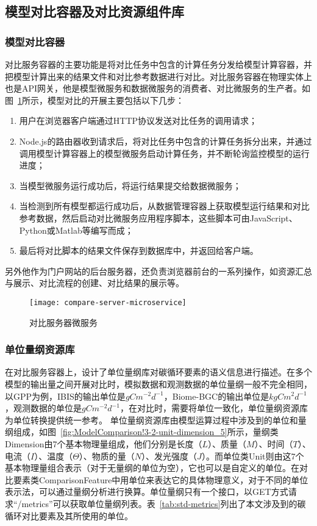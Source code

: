 \subsection{模型对比容器及对比资源组件库}
\subsubsection{模型对比容器}
对比服务容器的主要功能是将对比任务中包含的计算任务分发给模型计算容器，并把模型计算出来的结果文件和对比参考数据进行对比。对比服务容器在物理实体上也是API网关，他是模型微服务和数据微服务的消费者、对比微服务的生产者。如图~\ref{fig:compare-server-microservice}所示，模型对比的开展主要包括以下几步：

\begin{enumerate}[(1)]
\item 用户在浏览器客户端通过HTTP协议发送对比任务的调用请求；
\item Node.js的路由器收到请求后，将对比任务中包含的计算任务拆分出来，并通过调用模型计算容器上的模型微服务启动计算任务，并不断轮询监控模型的运行进度；
\item 当模型微服务运行成功后，将运行结果提交给数据微服务；
\item 当检测到所有模型都运行成功后，从数据管理容器上获取模型运行结果和对比参考数据，然后启动对比微服务应用程序脚本，这些脚本可由JavaScript、Python或Matlab等编写而成；
\item 最后将对比脚本的结果文件保存到数据库中，并返回给客户端。
\end{enumerate}

另外他作为门户网站的后台服务器，还负责浏览器前台的一系列操作，如资源汇总与展示、对比流程的创建、对比结果的展示等。

\begin{figure}[!htbp]
    \centering
    \texttt{[image: compare-server-microservice]}
    \caption{对比服务器微服务}
    \label{fig:compare-server-microservice}
\end{figure}

\subsubsection{单位量纲资源库}
在对比服务容器上，设计了单位量纲库对碳循环要素的语义信息进行描述。在多个模型的输出量之间开展对比时，模拟数据和观测数据的单位量纲一般不完全相同，以GPP为例，IBIS的输出单位是$gC m^{-2} d^{-1}$，Biome-BGC的输出单位是$kgC m^2 d^{-1}$，观测数据的单位是$gC m^{-2} d^{-1}$，在对比时，需要将单位一致化，单位量纲资源库为单位转换提供统一参考。
单位量纲资源库由模型运算过程中涉及到的单位和量纲组成，如图~\ref{fig:ModelComparison!3-2-unit-dimension_5}所示，量纲类Dimension由7个基本物理量组成，他们分别是长度（$L$）、质量（$M$）、时间（$T$）、电流（$I$）、温度（$\Theta$）、物质的量（$N$）、发光强度（$J$）。而单位类Unit则由这7个基本物理量组合表示（对于无量纲的单位为空），它也可以是自定义的单位。在对比要素类ComparisonFeature中用单位来表达它的具体物理意义，对于不同的单位表示法，可以通过量纲分析进行换算。单位量纲只有一个接口，以GET方式请求“/metrics”可以获取单位量纲列表。表~\ref{tab:std-metrics}列出了本文涉及到的碳循环对比要素及其所使用的单位。

